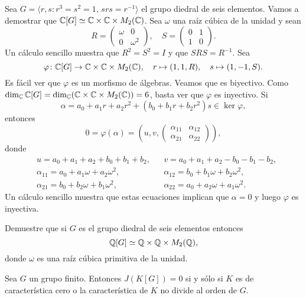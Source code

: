 \begin{exercise}
\begin{example}
	Sea $G=\langle r,s:r^3=s^2=1,\,srs=r^{-1}\rangle$ el grupo diedral de seis
	elementos. Vamos a demostrar que $\mathbb{C}[G]\simeq\mathbb{C}\times\mathbb{C}\times M_2(\mathbb{C})$.  
	Sea $\omega$ una raíz cúbica de la unidad y sean  
	\[
		R=\begin{pmatrix}
			\omega & 0\\
			0 & \omega^2
		\end{pmatrix},
		\quad
		S=\begin{pmatrix}
			0 & 1\\
			1 & 0
		\end{pmatrix}.
	\]
	Un cálculo sencillo muestra que $R^2=S^2=I$ y que $SRS=R^{-1}$. Sea
	\[
		\varphi\colon\mathbb{C}[G]\to\mathbb{C}\times\mathbb{C}\times M_2(\mathbb{C}),\quad
		r\mapsto (1,1,R),\quad
		s\mapsto (1,-1,S).
	\]
	Es fácil ver que $\varphi$ es un morfismo de álgebras. Veamos que es
	biyectivo. Como $\dim_{\mathbb{C}}\mathbb{C}[G]=\dim_{\mathbb{C}}(\mathbb{C}\times\mathbb{C}\times M_2(\mathbb{C}))=6$,
	basta ver que $\varphi$ es inyectivo. Si 
	\[
		\alpha=a_0+a_1r+a_2r^2+(b_0+b_1r+b_2r^2)s\in\ker\varphi,
	\]
	entonces 
	\[
		0=\varphi(\alpha)=\left(u,v,\begin{pmatrix} \alpha_{11} & \alpha_{12}\\\alpha_{21}&\alpha_{22}\end{pmatrix}\right), 
	\]
	donde
	\begin{align*}
		&u = a_0+a_1+a_2+b_0+b_1+b_2, && v = a_0+a_1+a_2-b_0-b_1-b_2,\\
		&\alpha_{11}=a_0+a_1\omega+a_2\omega^2, && \alpha_{12}=b_0+b_1\omega+b_2\omega^2,\\
		&\alpha_{21}=b_0+b_2\omega+b_1\omega^2, && \alpha_{22}=a_0+a_2\omega+a_1\omega^2.
	\end{align*}
	Un cálculo sencillo muestra que estas ecuaciones implican que
	$\alpha=0$ y luego $\varphi$ es inyectiva.  
\end{example}

\begin{exercise}
	Demuestre que si $G$ es el grupo diedral de seis elementos entonces
	\[
		\mathbb{Q}[G]\simeq\mathbb{Q}\times\mathbb{Q}\times M_2(\mathbb{Q}),
	\]
	donde $\omega$ es una raíz cúbica primitiva de la unidad.
\end{exercise}

\begin{theorem}[Maschke]
	Sea $G$ un grupo finito. Entonces $J(K[G])=0$ si y sólo si $K$ es de
	característica cero o la característica de $K$ no divide al orden de $G$.
\end{theorem}


\end{exercise}
